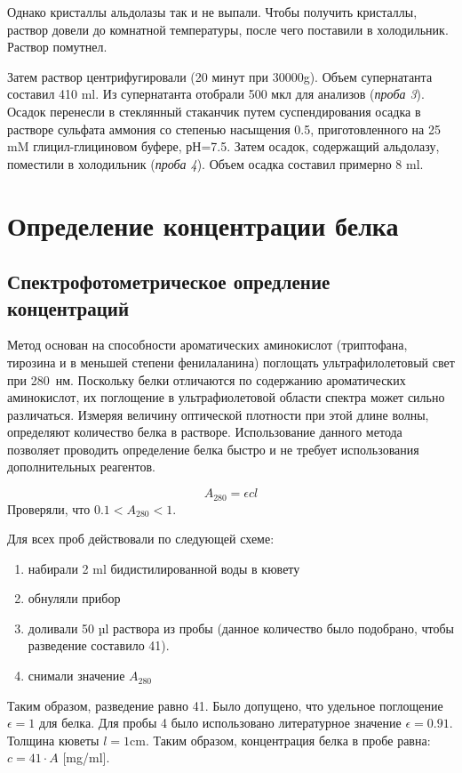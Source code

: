 Однако кристаллы альдолазы так и не выпали.
Чтобы получить кристаллы, раствор довели до комнатной температуры,
после чего поставили в холодильник. Раствор помутнел.

Затем раствор центрифугировали (20 минут при 30000g).
Объем супернатанта составил 410 ml.
Из супернатанта отобрали 500 мкл для анализов (\emph{проба 3}).
Осадок перенесли в стеклянный стаканчик путем суспендирования осадка
в растворе сульфата аммония со степенью насыщения 0.5,
приготовленного на 25 mM глицил-глициновом буфере, рН=7.5.
Затем осадок, содержащий альдолазу, поместили в холодильник (\emph{проба 4}).
Объем осадка составил примерно 8 ml.

\section{Определение концентрации белка}

\subsection{Спектрофотометрическое опредление концентраций}
Метод основан на способности ароматических аминокислот (триптофана, тирозина и
в меньшей степени фенилаланина) поглощать ультрафилолетовый свет при 280~нм.
Поскольку белки отличаются по содержанию ароматических аминокислот, их
поглощение в ультрафиолетовой области спектра может сильно различаться.
Измеряя величину оптической плотности при этой длине волны, определяют
количество белка в растворе. Использование данного метода позволяет проводить
определение белка быстро и не требует использования дополнительных реагентов.

$$ A_{280} = \epsilon c l $$
Проверяли, что $ 0.1 < A_{280} < 1 $.

Для всех проб действовали по следующей схеме:
\begin{enumerate}
\item набирали 2 ml бидистилированной воды в кювету
\item обнуляли прибор
\item доливали 50 µl раствора из пробы
    (данное количество было подобрано, чтобы разведение составило 41).
\item снимали значение $A_{280}$
\end{enumerate}
Таким образом, разведение равно 41.
Было допущено, что удельное поглощение $\epsilon = 1$ для белка.
Для пробы 4 было использовано литературное значение $\epsilon = 0.91$.
Толщина кюветы $l = 1 \text{cm}$.
Таким образом, концентрация белка в пробе равна: $ c=41 \cdot A $ [mg/ml].

